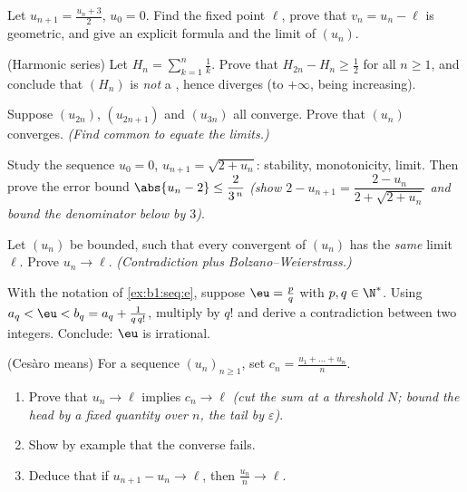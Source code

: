 \begin{exercise}[$\star$]\label{exo:b1:seq:4}
Let $u_{n+1} = \frac{u_n + 3}{2}$, $u_0 = 0$. Find the fixed point
$\ell$, prove that $v_n = u_n - \ell$ is geometric, and give an
explicit formula and the limit of $(u_n)$.
\end{exercise}

\begin{exercise}[$\star\star$]\label{exo:b1:seq:5}
(Harmonic series) Let $H_n = \sum_{k=1}^{n} \frac 1k$. Prove that
$H_{2n} - H_n \geq \frac12$ for all $n \geq 1$, and conclude that
$(H_n)$ is \emph{not} a , hence diverges (to
$+\infty$, being increasing).
\end{exercise}

\begin{exercise}[$\star\star$]\label{exo:b1:seq:6}
Suppose $(u_{2n})$, $(u_{2n+1})$ and $(u_{3n})$ all converge. Prove
that $(u_n)$ converges. \emph{(Find common  to equate the
limits.)}
\end{exercise}

\begin{exercise}[$\star\star$]\label{exo:b1:seq:7}
Study the sequence $u_0 = 0$, $u_{n+1} = \sqrt{2 + u_n}$:
stability, monotonicity, limit. Then prove the error bound
$\abs{u_n - 2} \leq \dfrac{2}{3^{\,n}}$ \emph{(show $2 - u_{n+1} =
\dfrac{2 - u_n}{2 + \sqrt{2 + u_n}}$ and bound the denominator below
by $3$)}.
\end{exercise}

\begin{exercise}[$\star\star$]\label{exo:b1:seq:8}
Let $(u_n)$ be bounded, such that every convergent  of
$(u_n)$ has the \emph{same} limit $\ell$. Prove $u_n \to \ell$.
\emph{(Contradiction plus Bolzano--Weierstrass.)}
\end{exercise}

\begin{exercise}[$\star\star\star$]\label{exo:b1:seq:9}
With the notation of \cref{ex:b1:seq:e}, suppose $\eu = \frac pq$
with $p, q \in \N^*$. Using $a_q < \eu < b_q = a_q + \frac{1}{q\,
q!}$, multiply by $q!$ and derive a contradiction between two
integers. Conclude: $\eu$ is irrational.
\end{exercise}

\begin{exercise}[$\star\star\star$]\label{exo:b1:seq:10}
(Ces\`aro means) For a sequence $(u_n)_{n \geq 1}$, set $c_n =
\frac{u_1 + \dots + u_n}{n}$.
\begin{enumerate}
  \item Prove that $u_n \to \ell$ implies $c_n \to \ell$ \emph{(cut
        the sum at a threshold $N$; bound the head by a fixed
        quantity over $n$, the tail by $\varepsilon$)}.
  \item Show by example that the converse fails.
  \item Deduce that if $u_{n+1} - u_n \to \ell$, then $\frac{u_n}{n}
        \to \ell$.
\end{enumerate}
\end{exercise}


